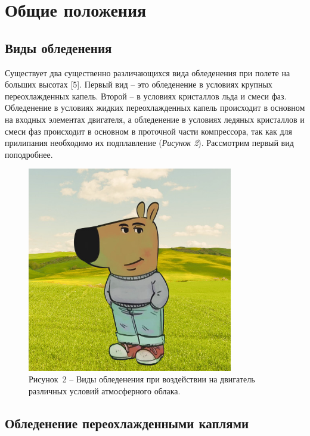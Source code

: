 \chapter{Общие положения}

\section{Виды обледенения}

Существует два существенно различающихся вида обледенения при полете на больших высотах [5]. Первый вид – это обледенение в условиях крупных переохлажденных капель. Второй – в условиях кристаллов льда и смеси фаз. Обледенение в условиях жидких переохлажденных капель происходит в основном на входных элементах двигателя, а обледенение в условиях ледяных кристаллов и смеси фаз происходит в основном в проточной части компрессора, так как для прилипания необходимо их подплавление (\textit{Рисунок 2}). Рассмотрим первый вид поподробнее.

\begin{figure}[H]
	\centering
	\includegraphics[width=0.8\textwidth]{figures/chill-guy.jpeg}
	\caption*{Рисунок~2 – Виды обледенения при воздействии на двигатель различных условий атмосферного облака.}
	\label{fig:-0}
\end{figure}

\section{Обледенение переохлажденными каплями}

